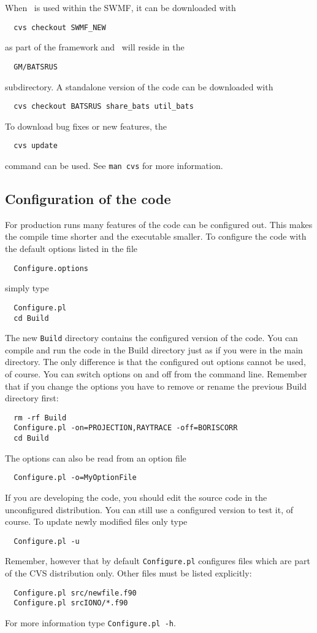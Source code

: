 When \BATSRUS\ is used within the SWMF, it can be downloaded with
\begin{verbatim}
  cvs checkout SWMF_NEW
\end{verbatim}
as part of the framework and \BATSRUS\ will reside in the
\begin{verbatim}
  GM/BATSRUS
\end{verbatim}
subdirectory. A standalone version of the code can be downloaded
with
\begin{verbatim}
  cvs checkout BATSRUS share_bats util_bats
\end{verbatim}
To download bug fixes or new features, the 
\begin{verbatim}
  cvs update
\end{verbatim}
command can be used. See {\tt man cvs} for more information.

\subsection{Configuration of the code}

For production runs many features of the code can be configured out.
This makes the compile time shorter and the executable smaller.
To configure the code with the default options listed in the file
\begin{verbatim}
  Configure.options
\end{verbatim}
simply type
\begin{verbatim}
  Configure.pl
  cd Build
\end{verbatim}
The new {\tt Build} directory contains the configured version of the code.
You can compile and run the code in the Build directory just as if you were
in the main directory. The only difference is that the configured out
options cannot be used, of course. You can switch options on and off
from the command line. Remember that if you change the options 
you have to remove or rename the previous Build directory first:
\begin{verbatim}
  rm -rf Build
  Configure.pl -on=PROJECTION,RAYTRACE -off=BORISCORR
  cd Build
\end{verbatim}
The options can also be read from an option file
\begin{verbatim}
  Configure.pl -o=MyOptionFile
\end{verbatim}
If you are developing the code, you should edit the source code
in the unconfigured distribution. You can still use a configured
version to test it, of course. To update newly modified files only type
\begin{verbatim}
  Configure.pl -u
\end{verbatim}
Remember, however that by default {\tt Configure.pl} configures files 
which are part of the CVS distribution only. Other files must be listed
explicitly:
\begin{verbatim}
  Configure.pl src/newfile.f90
  Configure.pl srcIONO/*.f90
\end{verbatim}
For more information type {\tt Configure.pl -h}.

